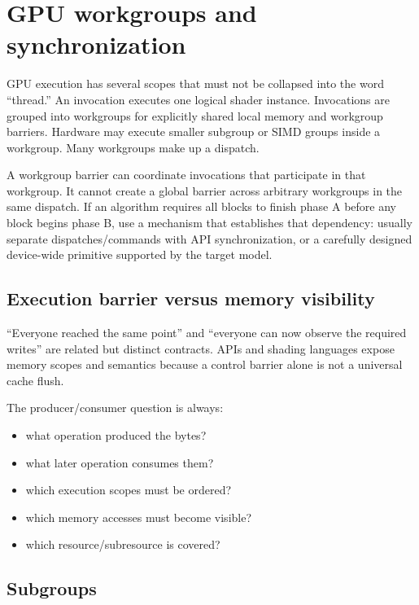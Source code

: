 \hypertarget{appendix-f662b5b1773b}{}
\section{GPU workgroups and synchronization}\label{appendix-f662b5b1773b-gpu-workgroups-and-synchronization}

GPU execution has several scopes that must not be collapsed into the word ``thread.'' An invocation executes one logical shader instance. Invocations are grouped into workgroups for explicitly shared local memory and workgroup barriers. Hardware may execute smaller subgroup or SIMD groups inside a workgroup. Many workgroups make up a dispatch.

A workgroup barrier can coordinate invocations that participate in that workgroup. It cannot create a global barrier across arbitrary workgroups in the same dispatch. If an algorithm requires all blocks to finish phase A before any block begins phase B, use a mechanism that establishes that dependency: usually separate dispatches/commands with API synchronization, or a carefully designed device-wide primitive supported by the target model.

\subsection{Execution barrier versus memory visibility}\label{appendix-f662b5b1773b-execution-barrier-versus-memory-visibility}

``Everyone reached the same point'' and ``everyone can now observe the required writes'' are related but distinct contracts. APIs and shading languages expose memory scopes and semantics because a control barrier alone is not a universal cache flush.

The producer/consumer question is always:

\begin{itemize}
\tightlist
\item
  what operation produced the bytes?
\item
  what later operation consumes them?
\item
  which execution scopes must be ordered?
\item
  which memory accesses must become visible?
\item
  which resource/subresource is covered?
\end{itemize}

\subsection{Subgroups}\label{appendix-f662b5b1773b-subgroups}

